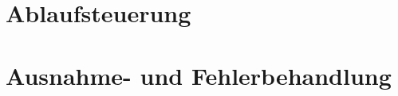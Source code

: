 
	



\section{Ablaufsteuerung}

\begin{quote}
\end{quote}

\section{Ausnahme- und Fehlerbehandlung}

